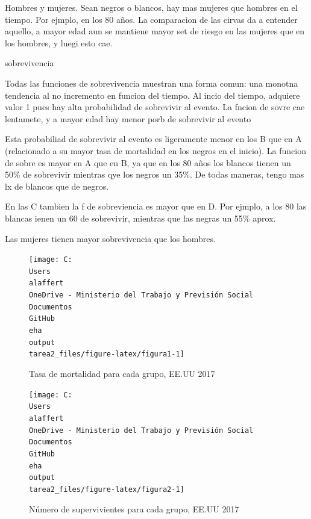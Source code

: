 \documentclass[
  12pt,
]{article}
\begin{document}
Hombres y mujeres. Sean negros o blancos, hay mas mujeres que hombres en
el tiempo. Por ejmplo, en los 80 años. La comparacion de las cirvas da a
entender aquello, a mayor edad aun se mantiene mayor set de riesgo en
las mujeres que en los hombres, y luegi esto cae.

sobrevivencia

Todas las funciones de sobrevivencia muestran una forma comun: una
monotna tendencia al no incremento en funcion del tiempo. Al incio del
tiempo, adquiere valor 1 pues hay alta probabilidad de sobrevivir al
evento. La fncion de sovre cae lentamete, y a mayor edad hay menor porb
de sobrevivir al evento

Esta probabiliad de sobrevivir al evento es ligeramente menor en los B
que en A (relacionado a su mayor tasa de mortalidad en los negros en el
inicio). La funcion de sobre es mayor en A que en B, ya que en los 80
años los blancos tienen un 50\% de sobrevivir mientras qye los negros un
35\%. De todas maneras, tengo mas lx de blancos que de negros.

En las C tambien la f de sobreviencia es mayor que en D. Por ejmplo, a
los 80 las blancas ienen un 60 de sobrevivir, mientras que las negras un
55\% aprox.

Las mujeres tienen mayor sobrevivencia que los hombres.

\begin{figure}

{\centering \texttt{[image: C:\\Users\\alaffert\\OneDrive - Ministerio del Trabajo y Previsión Social\\Documentos\\GitHub\\eha\\output\\tarea2\_files/figure-latex/figura1-1]} 

}

\caption{Tasa de mortalidad para cada grupo, EE.UU 2017}\label{fig:figura1}
\end{figure}

\begin{figure}

{\centering \texttt{[image: C:\\Users\\alaffert\\OneDrive - Ministerio del Trabajo y Previsión Social\\Documentos\\GitHub\\eha\\output\\tarea2\_files/figure-latex/figura2-1]} 

}

\caption{Número de supervivientes para cada grupo, EE.UU 2017}\label{fig:figura2}
\end{figure}
\end{document}
